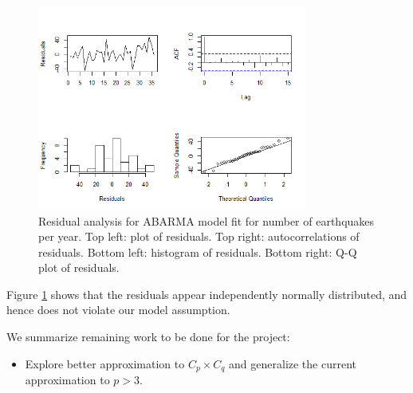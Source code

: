 \begin{figure}[h]
    \centering
    \includegraphics[width=3.5in]{diagnostics_eq.png}
    \caption{Residual analysis for ABARMA model fit for number of earthquakes per year. Top left: plot of residuals. Top right: autocorrelations of residuals. Bottom left: histogram of residuals. Bottom right: Q-Q plot of residuals.}
    \label{fig: earth}
\end{figure}

Figure \ref{fig: earth} shows that the residuals appear independently normally distributed, and hence does not violate our model assumption.
\fi

\iffalse
We summarize remaining work to be done for the project:
\begin{itemize}
    \item Explore better approximation to $C_p \times C_q$ and generalize the current approximation to $p>3$.
\end{itemize}

